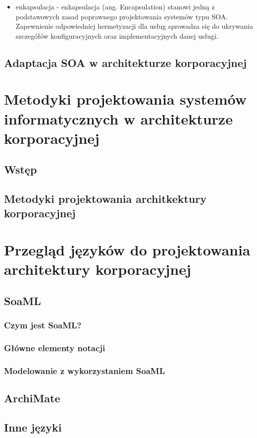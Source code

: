 \begin{itemize}
\item{enkapsulacja - enkapsulacja (ang. Encapsulation) stanowi jedną z podstawowych zasad poprawnego projektowania systemów typu SOA. Zapewnienie odpowiedniej hermetyzacji dla usług sprowadza się do ukrywania szczegółów konfiguracyjnych oraz implementacyjnych danej usługi.}
\end{itemize}

\section{Adaptacja SOA w architekturze korporacyjnej}

\chapter{Metodyki projektowania systemów informatycznych w architekturze korporacyjnej}
\section{Wstęp}
\section{Metodyki projektowania architkektury korporacyjnej}

\chapter{Przegląd języków do projektowania architektury korporacyjnej}
\section{SoaML}
\subsection{Czym jest SoaML?}
\subsection{Główne elementy notacji}
\subsection{Modelowanie z wykorzystaniem SoaML}
\section{ArchiMate}
\section{Inne języki}

